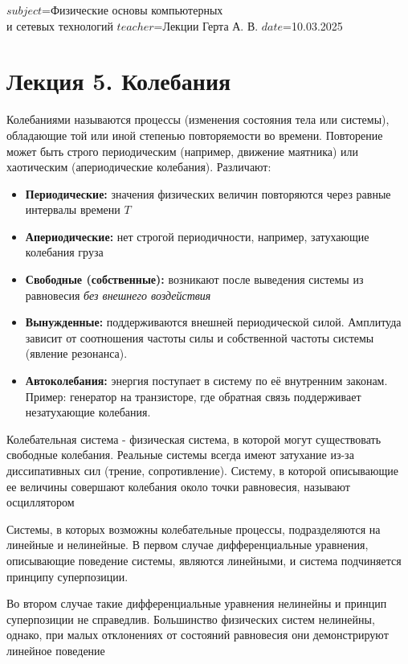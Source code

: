 $subject$=Физические основы компьютерных \\ и сетевых технологий
$teacher$=Лекции Герта А. В.
$date$=10.03.2025

\section{Лекция 5. Колебания}

Колебаниями называются процессы (изменения состояния тела или системы), 
обладающие той или иной степенью повторяемости во времени. 
Повторение может быть строго периодическим (например, движение маятника) 
или хаотическим (апериодические колебания). Различают:

\begin{itemize}
    \item \textbf{Периодические:} значения физических величин повторяются через равные интервалы времени $T$
    
    \item \textbf{Апериодические:} нет строгой периодичности, например, затухающие колебания груза

    \item \textbf{Свободные (собственные):} возникают после выведения системы из равновесия \textit{без внешнего воздействия}
    
    \item \textbf{Вынужденные:} поддерживаются внешней периодической силой. Амплитуда зависит от соотношения частоты силы и собственной частоты системы (явление резонанса).
    
    \item \textbf{Автоколебания:} энергия поступает в систему по её внутренним законам. Пример: генератор на транзисторе, где обратная связь поддерживает незатухающие колебания.
\end{itemize}

Колебательная система - физическая система, в которой могут существовать свободные колебания. 
Реальные системы всегда имеют затухание из-за диссипативных сил (трение, сопротивление).
Систему, в которой описывающие ее величины совершают колебания около точки равновесия, называют осциллятором

Системы, в которых возможны колебательные процессы, подразделяются на линейные и нелинейные.
В первом случае дифференциальные уравнения, описывающие поведение системы, являются линейными, 
и система подчиняется принципу суперпозиции.

Во втором случае такие дифференциальные уравнения нелинейны и принцип суперпозиции не справедлив. Большинство
физических систем нелинейны, однако, при малых отклонениях от состояний равновесия они демонстрируют линейное поведение

